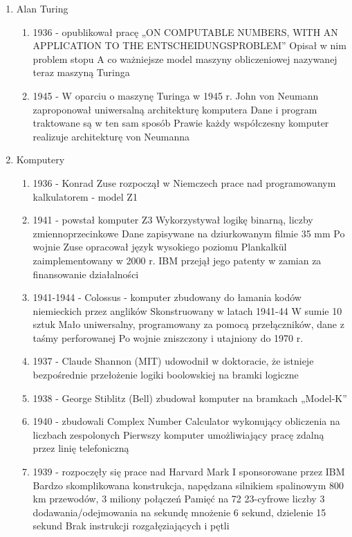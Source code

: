 \documentclass[a4paper,twoside,onecolumn]{report}
\begin{document}
\begin{enumerate}[-]
\begin{enumerate}[*]
				\end{enumerate}
			\item Alan Turing
				\begin{enumerate}[*]
					\item 1936 - opublikował pracę „ON COMPUTABLE NUMBERS, WITH AN APPLICATION TO THE ENTSCHEIDUNGSPROBLEM” Opisał w nim problem stopu A co 							ważniejsze model maszyny obliczeniowej nazywanej teraz maszyną Turinga
					\item 1945 - W oparciu o maszynę Turinga w 1945 r. John von Neumann zaproponował uniwersalną architekturę komputera Dane i program traktowane są w 							ten sam sposób Prawie każdy współczesny komputer realizuje architekturę von Neumanna
				\end{enumerate}
			\item Komputery
				\begin{enumerate}[*]
					\item 1936 - Konrad Zuse rozpoczął w Niemczech prace nad programowanym kalkulatorem - model Z1 
					\item 1941 - powstał komputer Z3 Wykorzystywał logikę binarną, liczby zmiennoprzecinkowe Dane zapisywane na dziurkowanym filmie 35 mm Po wojnie Zuse 						opracował język wysokiego poziomu Plankalkül zaimplementowany w 2000 r. IBM przejął jego patenty w zamian za finansowanie działalności
					\item 1941-1944 - Colossus - komputer zbudowany do łamania kodów niemieckich przez anglików Skonstruowany w latach 1941-44 W sumie 10 sztuk Mało 								uniwersalny, programowany za pomocą przełączników, dane z taśmy perforowanej Po wojnie zniszczony i utajniony do 1970 r.
					\item 1937 - Claude Shannon (MIT) udowodnił w doktoracie, że istnieje bezpośrednie przełożenie logiki boolowskiej na bramki logiczne
					\item 1938 - George Stiblitz (Bell) zbudował komputer na bramkach „Model-K” 
					\item 1940 - zbudowali Complex Number Calculator wykonujący obliczenia na liczbach zespolonych Pierwszy komputer umożliwiający pracę zdalną przez linię 								telefoniczną
					\item 1939 - rozpoczęły się prace nad Harvard Mark I sponsorowane przez IBM Bardzo skomplikowana konstrukcja, napędzana silnikiem spalinowym 800 km 								przewodów, 3 miliony połączeń Pamięć na 72 23-cyfrowe liczby 3 dodawania/odejmowania na sekundę mnożenie 6 sekund, dzielenie 15 sekund Brak 								instrukcji rozgałęziających i pętli

\end{enumerate}
\end{enumerate}
\end{document}
